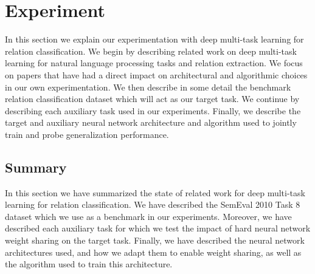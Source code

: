 \chapter{Experiment}
In this section we explain our experimentation with deep multi-task learning for relation classification. We begin by describing related work on deep multi-task learning for natural language processing tasks and relation extraction. We focus on papers that have had a direct impact on architectural and algorithmic choices in our own experimentation. We then describe in some detail the benchmark relation classification dataset which will act as our target task. We continue by describing each auxiliary task used in our experiments. Finally, we describe the target and auxiliary neural network architecture and algorithm used to jointly train and probe generalization performance.






\section{Summary}
In this section we have summarized the state of related work for deep multi-task learning for relation classification. We have described the SemEval 2010 Task 8 dataset which we use as a benchmark in our experiments. Moreover, we have described each auxiliary task for which we test the impact of hard neural network weight sharing on the target task. Finally, we have described the neural network architectures used, and how we adapt them to enable weight sharing, as well as the algorithm used to train this architecture.